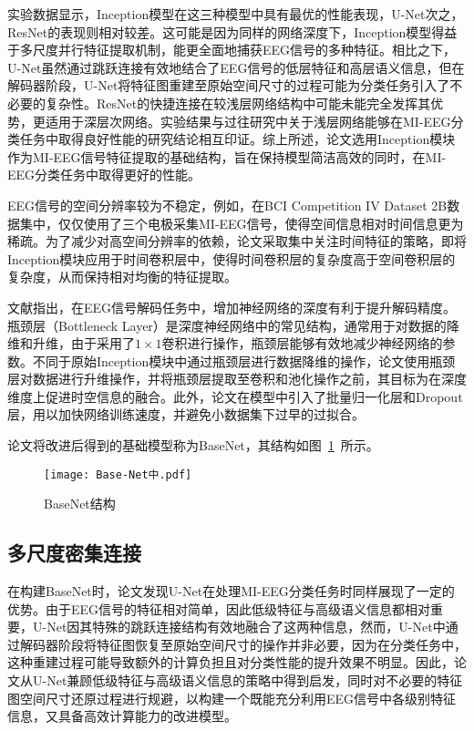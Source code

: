 实验数据显示，Inception模型在这三种模型中具有最优的性能表现，U-Net次之，ResNet的表现则相对较差。这可能是因为同样的网络深度下，Inception模型得益于多尺度并行特征提取机制，能更全面地捕获EEG信号的多种特征。相比之下，U-Net虽然通过跳跃连接有效地结合了EEG信号的低层特征和高层语义信息，但在解码器阶段，U-Net将特征图重建至原始空间尺寸的过程可能为分类任务引入了不必要的复杂性。ResNet的快捷连接在较浅层网络结构中可能未能完全发挥其优势，更适用于深层次网络。实验结果与过往研究中关于浅层网络能够在MI-EEG分类任务中取得良好性能的研究结论相互印证。综上所述，论文选用Inception模块作为MI-EEG信号特征提取的基础结构，旨在保持模型简洁高效的同时，在MI-EEG分类任务中取得更好的性能。

EEG信号的空间分辨率较为不稳定，例如，在BCI Competition IV Dataset 2B\cite{tangermann2012review}数据集中，仅仅使用了三个电极采集MI-EEG信号，使得空间信息相对时间信息更为稀疏。为了减少对高空间分辨率的依赖，论文采取集中关注时间特征的策略，即将Inception模块应用于时间卷积层中，使得时间卷积层的复杂度高于空间卷积层的复杂度，从而保持相对均衡的特征提取。

文献\cite{schirrmeister2017deep,lawhern2018eegnet}指出，在EEG信号解码任务中，增加神经网络的深度有利于提升解码精度。瓶颈层（Bottleneck Layer）是深度神经网络中的常见结构\cite{he2016deep,huang2017densely}，通常用于对数据的降维和升维，由于采用了\(1\times1\)卷积进行操作，瓶颈层能够有效地减少神经网络的参数。不同于原始Inception模块中通过瓶颈层进行数据降维的操作，论文使用瓶颈层对数据进行升维操作，并将瓶颈层提取至卷积和池化操作之前，其目标为在深度维度上促进时空信息的融合。此外，论文在模型中引入了批量归一化层和Dropout层，用以加快网络训练速度，并避免小数据集下过早的过拟合。

论文将改进后得到的基础模型称为BaseNet，其结构如图~\ref{fig:BaseNet}~所示。
\begin{figure}
    \centering
    \texttt{[image: Base-Net中.pdf]}
    \caption{BaseNet结构}
    \label{fig:BaseNet}
\end{figure}

\subsection{多尺度密集连接}

在构建BaseNet时，论文发现U-Net在处理MI-EEG分类任务时同样展现了一定的优势。由于EEG信号的特征相对简单，因此低级特征与高级语义信息都相对重要，U-Net因其特殊的跳跃连接结构有效地融合了这两种信息，然而，U-Net中通过解码器阶段将特征图恢复至原始空间尺寸的操作并非必要，因为在分类任务中，这种重建过程可能导致额外的计算负担且对分类性能的提升效果不明显。因此，论文从U-Net兼顾低级特征与高级语义信息的策略中得到启发，同时对不必要的特征图空间尺寸还原过程进行规避，以构建一个既能充分利用EEG信号中各级别特征信息，又具备高效计算能力的改进模型。

